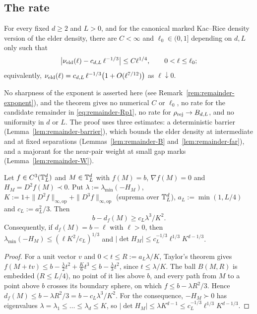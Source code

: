 \subsection{The rate}\label{ssec:remainder-rate}

\begin{theorem}\label{thm:remainder-rate}
For every fixed $d\ge2$ and $L>0$, and for the canonical marked Kac--Rice density version of the elder density, there are $C<\infty$ and $\ell_0\in(0,1]$ depending on $d,L$ only such that
\begin{equation}\label{eq:remainder-Rpp}
\bigl|\nu_{\mathrm{eld}}(\ell)-c_{d,L}\,\ell^{-1/3}\bigr|\le C\ell^{1/4},\qquad 0<\ell\le\ell_0;
\end{equation}
equivalently, $\nu_{\mathrm{eld}}(\ell)=c_{d,L}\,\ell^{-1/3}\bigl(1+O(\ell^{7/12})\bigr)$ as $\ell\downarrow0$.
\end{theorem}

No sharpness of the exponent is asserted here (see Remark~\ref{rem:remainder-exponent}), and the theorem gives no numerical $C$ or $\ell_0$, no rate for the candidate remainder in \eqref{eq:remainder-Rp1}, no rate for $\rho_{\mathrm{rej}}\to B_{d,L}$, and no uniformity in $d$ or $L$. The proof uses three estimates: a deterministic barrier (Lemma~\ref{lem:remainder-barrier}), which bounds the elder density at intermediate and at fixed separations (Lemmas~\ref{lem:remainder-B} and~\ref{lem:remainder-far}), and a majorant for the near-pair weight at small gap marks (Lemma~\ref{lem:remainder-W}).

\begin{lemma}\label{lem:remainder-barrier}
Let $f\in C^3(\mathbb T^d_L)$ and $M\in\mathbb T^d_L$ with $f(M)=b$, $\nabla f(M)=0$ and $H_M=D^2f(M)\prec0$. Put $\lambda:=\lambda_{\min}(-H_M)$, $K:=1+\|D^2f\|_{\infty,\mathrm{op}}+\|D^3f\|_{\infty,\mathrm{op}}$ (suprema over $\mathbb T^d_L$), $a_L:=\min(1,L/4)$ and $c_L:=a_L^2/3$. Then
\begin{equation}\label{eq:remainder-barrier}
b-d_f(M)\ge c_L\lambda^3/K^2 .
\end{equation}
Consequently, if $d_f(M)=b-\ell$ with $\ell>0$, then $\lambda_{\min}(-H_M)\le(\ell K^2/c_L)^{1/3}$ and $|\det H_M|\le c_L^{-1/3}\ell^{1/3}K^{d-1/3}$.
\end{lemma}

\begin{proof}
For a unit vector $v$ and $0<t\le R:=a_L\lambda/K$, Taylor's theorem gives $f(M+tv)\le b-\frac\lambda2t^2+\frac K6t^3\le b-\frac\lambda3t^2$, since $t\le\lambda/K$. The ball $B(M,R)$ is embedded ($R\le L/4$), no point of it lies above $b$, and every path from $M$ to a point above $b$ crosses its boundary sphere, on which $f\le b-\lambda R^2/3$. Hence $d_f(M)\le b-\lambda R^2/3=b-c_L\lambda^3/K^2$. For the consequence, $-H_M\succ0$ has eigenvalues $\lambda=\lambda_1\le\dots\le\lambda_d\le K$, so $|\det H_M|\le\lambda K^{d-1}\le c_L^{-1/3}\ell^{1/3}K^{d-1/3}$.
\end{proof}

